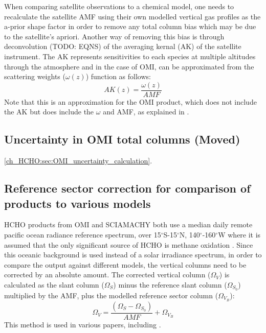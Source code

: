     When comparing satellite observations to a chemical model, one needs to recalculate the satellite AMF using their own modelled vertical gas profiles as the a-prior shape factor in order to remove any total column bias which may be due to the satellite's apriori.
    Another way of removing this bias is through deconvolution (TODO: EQNS) of the averaging kernal (AK) of the satellite instrument.
    The AK represents sensitivities to each species at multiple altitudes through the atmosphere and in the case of OMI, can be approximated from the scattering weights ($\omega(z)$) function as follows:
    \begin{equation} \label{ch_HCHO:eqn:AKfromw}
      AK(z) = \frac{\omega(z)}{AMF}
    \end{equation}
    Note that this is an approximation for the OMI product, which does not include the AK but does include the $\omega$ and AMF, as explained in \citet{Abad2015}.
    
  \subsection{Uncertainty in OMI total columns (Moved)}
  \label{ch_HCHO:sec:OMIuncertainty}
    \ref{ch_HCHO:sec:OMI_uncertainty_calculation}.
    
  \subsection{Reference sector correction for comparison of products to various models}
    HCHO products from OMI and SCIAMACHY both use a median daily remote pacific ocean radiance reference spectrum, over 15$^{\circ}$S-15$^{\circ}$N, 140$^{\circ}$-160$^{\circ}$W where it is assumed that the only significant source of HCHO is methane oxidation \citep{DeSmedt2008,Barkley2013,Kurosu2014}.
    Since this oceanic background is used instead of a solar irradiance spectrum, in order to compare the output against different models, the vertical columns need to be corrected by an absolute amount.
    The corrected vertical column ($\Omega_V$) is calculated as the slant column ($\Omega_S$) minus the reference slant column ($\Omega_{S_0}$) multiplied by the AMF, plus the modelled reference sector column ($\Omega_{V_B}$):
    \begin{equation*}
      \Omega_V = \frac{ \left( \Omega_S - \Omega_{S_0} \right) }{ AMF } + \Omega_{V_B}
    \end{equation*}
    This method is used in various papers, including \citet{DeSmedt2008, DeSmedt2012, DeSmedt2015, Barkley2013, Bauwens2016}.
    
